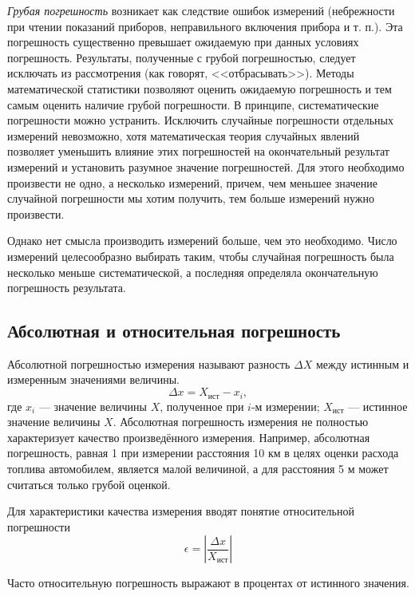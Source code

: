 \documentclass[a4paper, 12pt]{extarticle}
\newcommand{\eps}{\epsilon}
\begin{document}
\emph{Грубая погрешность} возникает как следствие ошибок измерений (небрежности при чтении показаний приборов, неправильного включения прибора и т. п.). Эта погрешность существенно превышает ожидаемую при данных условиях погрешность. Результаты, полученные с грубой погрешностью, следует исключать из рассмотрения (как говорят, <<отбрасывать>>). Методы математической статистики позволяют оценить ожидаемую погрешность и тем самым оценить наличие грубой погрешности. В принципе, систематические погрешности можно устранить. Исключить случайные погрешности отдельных измерений невозможно, хотя математическая теория случайных явлений позволяет уменьшить влияние этих погрешностей на окончательный результат измерений и установить разумное значение погрешностей. Для этого необходимо произвести не одно, а несколько измерений, причем, чем меньшее значение случайной погрешности мы хотим получить, тем больше измерений нужно произвести.

Однако нет смысла производить измерений больше, чем это необходимо. Число измерений целесообразно выбирать таким, чтобы случайная погрешность была несколько меньше систематической, а последняя определяла окончательную погрешность результата.

\subsection {Абсолютная и относительная погрешность}
Абсолютной погрешностью измерения называют разность $\Delta X$ между
истинным и измеренным значениями величины.
\begin{equation}
\label{eq:abs-error}
\Delta x = X_{\text{ист}} - x_i,
\end{equation}
где $x_i$ --- значение величины $X$, полученное при $i$-м измерении; $X_{\text{ист}}$ --- истинное значение величины $X$.
Абсолютная погрешность измерения не полностью характеризует
качество произведённого измерения. Например, абсолютная погрешность, равная 1 
при измерении расстояния 10 км в целях оценки расхода топлива автомобилем, является малой величиной, а для расстояния 5 м может
считаться только грубой оценкой.

Для характеристики качества измерения вводят понятие относительной погрешности
\begin{equation}
\label{eq:rel-error}
\eps = \left| \frac{\Delta x}{X_{\text{ист}}}\right|
\end{equation}

Часто относительную погрешность выражают в процентах от истинного значения.
\end{document}
